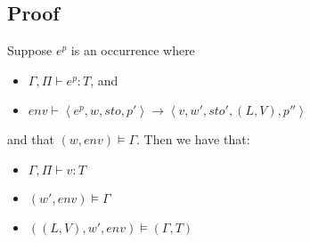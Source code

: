 \documentclass[../../master.tex]{subfiles}
\begin{document}
\subsection{Proof}
\begin{theorem}
	Suppose $e^p$ is an occurrence where
	\begin{itemize}
		\item $\Gamma,\Pi\vdash e^p : T$, and 
		\item $env\vdash\left\langle e^p,w,sto,p'\right\rangle\rightarrow\left\langle v,w',sto',(L,V),p''\right\rangle$
	\end{itemize}
	and that $(w,env)\models\Gamma$.
	Then we have that:
	\begin{itemize}
		\item $\Gamma,\Pi\vdash v : T$
		\item $(w',env)\models\Gamma$
		\item $((L,V), w', env)\models (\Gamma,T)$
	\end{itemize}
\end{theorem}
\end{document}
